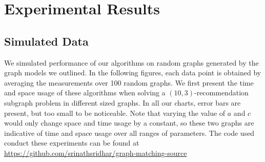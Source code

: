 \section{Experimental Results}
\label{expsec}

\subsection{Simulated Data}
We simulated performance of our algorithms on random graphs generated
by the graph models we outlined.
In the following figures, each data
point is obtained by averaging the measurements over 100 random
graphs. We first present the time and space usage of these algorithms when
solving a $(10,3)$-recommendation subgraph problem in different sized graphs.
In all our charts, error bars are present, but too small to be noticeable.
Note that varying the value of $a$ and $c$ would only change space and time
usage by a constant, so these two graphs are indicative of time and space
usage over all ranges of parameters. The code used conduct these experiments
can be found at \url{https://github.com/srinathsridhar/graph-matching-source}  

